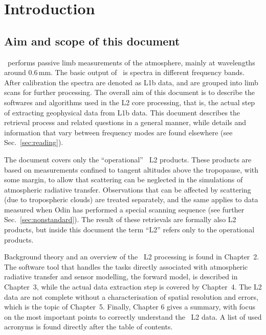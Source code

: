 \chapter{Introduction}
\label{chapter:introduction}

\setcounter{page}{1}


\section{Aim and scope of this document}
\label{sec:aim}
%
\smr\ performs passive limb measurements of the atmosphere, mainly at
wavelengths around 0.6\,mm. The basic output of \smr\ is spectra in different
frequency bands. After calibration the spectra are denoted as L1b data, and are
grouped into limb scans for further processing. The overall aim of this
document is to describe the softwares and algorithms used in the L2 core
processing, that is, the actual step of extracting geophysical data from L1b
data. This document describes the retrieval process and related questions in a
general manner, while details and information that vary between frequency
modes are found elsewhere (see Sec.~\ref{sec:reading}).

The document covers only the ``operational'' \smr\ L2 products. These products
are based on measurements confined to tangent altitudes above the tropopause,
with some margin, to allow that scattering can be neglected in the simulations
of atmospheric radiative transfer. Observations that can be affected by
scattering (due to tropospheric clouds) are treated separately, and the same
applies to data measured when Odin has performed a special scanning
sequence (see further Sec.~\ref{sec:nonstandard}). The result of these
retrievals are formally also L2 products, but inside this document the term
``L2'' refers only to the operational products.

Background theory and an overview of the \smr\ L2 processing is found in
Chapter~2. The software tool that handles the tasks directly associated with
atmospheric radiative transfer and sensor modelling, the forward model, is
described in Chapter~3, while the actual data extraction step is covered by
Chapter~4. The L2 data are not complete without a characterisation of
spatial resolution and errors, which is the topic of Chapter~5. Finally,
Chapter 6 gives a summary, with focus on the most important points to correctly
understand the \smr\ L2 data. A list of used acronyms is found directly after
the table of contents.




